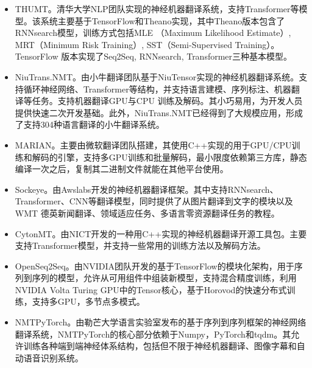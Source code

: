 \begin{appendices}
\begin{itemize}
\item THUMT。清华大学NLP团队实现的神经机器翻译系统，支持Transformer等模型。该系统主要基于TensorFlow和Theano实现，其中Theano版本包含了RNNsearch模型，训练方式包括MLE （Maximum Likelihood Estimate）, MRT（Minimum Risk Training）, SST（Semi-Supervised Training）。TensorFlow 版本实现了Seq2Seq, RNNsearch, Transformer三种基本模型。
\vspace{0.5em}
\item NiuTrans.NMT。由小牛翻译团队基于NiuTensor实现的神经机器翻译系统。支持循环神经网络、Transformer等结构，并支持语言建模、序列标注、机器翻译等任务。支持机器翻译GPU与CPU 训练及解码。其小巧易用，为开发人员提供快速二次开发基础。此外，NiuTrans.NMT已经得到了大规模应用，形成了支持304种语言翻译的小牛翻译系统。
\vspace{0.5em}
\item MARIAN。主要由微软翻译团队搭建，其使用C++实现的用于GPU/CPU训练和解码的引擎，支持多GPU训练和批量解码，最小限度依赖第三方库，静态编译一次之后，复制其二进制文件就能在其他平台使用。
\vspace{0.5em}
\item Sockeye。由Awslabs开发的神经机器翻译框架。其中支持RNNsearch、Transformer、CNN等翻译模型，同时提供了从图片翻译到文字的模块以及WMT 德英新闻翻译、领域适应任务、多语言零资源翻译任务的教程。
\vspace{0.5em}
\item CytonMT。由NICT开发的一种用C++实现的神经机器翻译开源工具包。主要支持Transformer模型，并支持一些常用的训练方法以及解码方法。
\vspace{0.5em}
\item OpenSeq2Seq。由NVIDIA团队开发的基于TensorFlow的模块化架构，用于序列到序列的模型，允许从可用组件中组装新模型，支持混合精度训练，利用NVIDIA Volta Turing GPU中的Tensor核心，基于Horovod的快速分布式训练，支持多GPU，多节点多模式。
\vspace{0.5em}
\item NMTPyTorch。由勒芒大学语言实验室发布的基于序列到序列框架的神经网络翻译系统，NMTPyTorch的核心部分依赖于Numpy，PyTorch和tqdm。其允许训练各种端到端神经体系结构，包括但不限于神经机器翻译、图像字幕和自动语音识别系统。
\vspace{0.5em}
\end{itemize}

\end{appendices}

